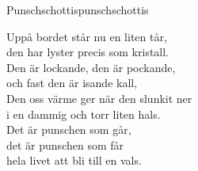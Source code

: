 \begin{song}{Punschschottis}{punschschottis}
\begin{vers}
Uppå bordet står nu en liten tår,\\
den har lyster precis som kristall.\\
Den är lockande, den är pockande,\\
och fast den är isande kall,\\
Den oss värme ger när den slunkit ner\\
i en dammig och torr liten hals.\\
Det är punschen som går,\\
det är punschen som får\\
hela livet att bli till en vals.\\
\end{vers}
\end{song}
